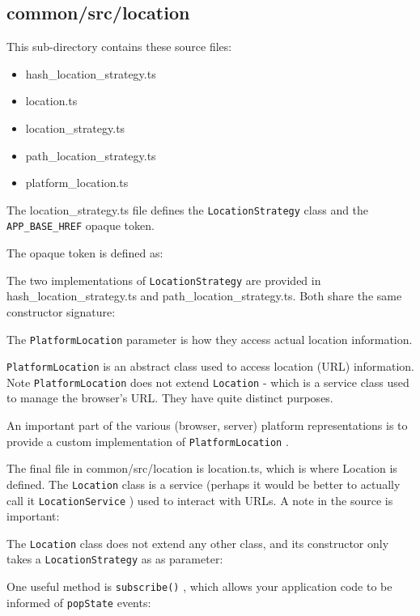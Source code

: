 \subsection{common/src/location}

This sub-directory contains these source files:

\begin{itemize}
  \item hash\_location\_strategy.ts
  \item location.ts
  \item location\_strategy.ts
  \item path\_location\_strategy.ts
  \item platform\_location.ts
\end{itemize}

The location\_strategy.ts file defines the
\texttt{LocationStrategy}
class and the
\texttt{APP\_BASE\_HREF}
opaque token.



The opaque token is defined as:



The two implementations of
\texttt{LocationStrategy}
are provided in
hash\_location\_strategy.ts and path\_location\_strategy.ts. Both share the same
constructor signature:



The
\texttt{PlatformLocation}
parameter is how they access actual location information.

\texttt{PlatformLocation}
is an abstract class used to access location (URL) information.
Note
\texttt{PlatformLocation}
does not extend
\texttt{Location}
- which is a service class used to
manage the browser’s URL. They have quite distinct purposes.



An important part of the various (browser, server) platform representations is to
provide a custom implementation of
\texttt{PlatformLocation}
.

The final file in common/src/location is location.ts, which is where Location is defined.
The
\texttt{Location}
class is a service (perhaps it would be better to actually call it
\texttt{LocationService}
) used to interact with URLs. A note in the source is important:



The
\texttt{Location}
class does not extend any other class, and its constructor only takes a
\texttt{LocationStrategy}
as as parameter:



One useful method is
\texttt{subscribe()}
, which allows your application code to be informed
of
\texttt{popState}
events:


